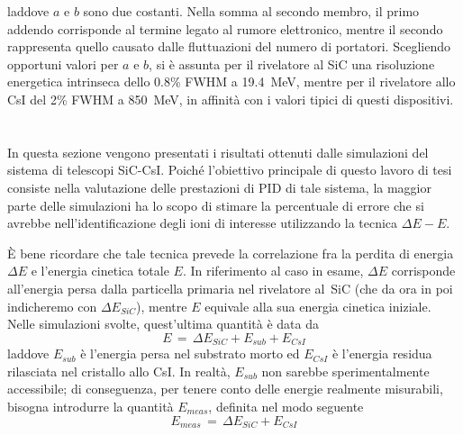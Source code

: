 laddove $a$ e $b$ sono due costanti.
Nella somma al secondo membro, il primo addendo corrisponde al termine legato al rumore elettronico, mentre il secondo rappresenta quello causato dalle fluttuazioni del numero di portatori.
%
%
Scegliendo opportuni valori per $a$ e $b$, si è assunta per il rivelatore al SiC una risoluzione energetica intrinseca dello 0.8\% FWHM a 19.4~MeV, mentre per il rivelatore allo CsI del 2\% FWHM a 850~MeV, in affinità con i valori tipici di questi dispositivi. 









\section{}

In questa sezione vengono presentati i risultati ottenuti dalle simulazioni \geant{} del sistema di telescopi SiC-CsI.
Poiché l'obiettivo principale di questo lavoro di tesi consiste nella valutazione delle prestazioni di PID di tale sistema, la maggior parte delle simulazioni ha lo scopo di stimare la percentuale di errore che si avrebbe nell'identificazione degli ioni di interesse utilizzando la tecnica $\Delta E - E$.

È bene ricordare che tale tecnica prevede la correlazione fra la perdita di energia $\Delta E$ e l'energia cinetica totale $E$. In riferimento al caso in esame, $\Delta E$ corrisponde all'energia persa dalla particella primaria nel rivelatore al~SiC (che da ora in poi indicheremo con $ \Delta E_{SiC}$), mentre $E$ equivale alla sua energia cinetica iniziale. Nelle simulazioni svolte, quest'ultima quantità è data da
\begin{equation}
	E \, = \, \Delta E_{SiC} + E_{sub} + E_{CsI}
\end{equation}
laddove $E_{sub}$ è l'energia persa nel substrato morto ed $E_{CsI}$ è l'energia residua rilasciata nel cristallo allo CsI.
In realtà, $E_{sub}$ non sarebbe sperimentalmente accessibile; di conseguenza, per tenere conto delle energie realmente misurabili, bisogna introdurre la quantità $E_{meas}$, definita nel modo seguente
\begin{equation}
	E_{meas} \, = \, \Delta E_{SiC} + E_{CsI}
\end{equation}

